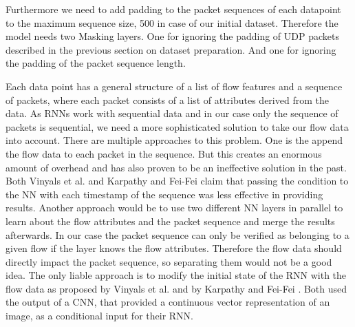 \documentclass[
	ngerman,
	ruledheaders=section,%
	class=report,%
	thesis={type=bachelor},%
	accentcolor=9c,%
	custommargins=true,%
	marginpar=false,%
	parskip=half-,%
	fontsize=11pt,%
]{tudapub}
\begin{document}
Furthermore we need to add padding to the packet sequences of each datapoint to the maximum sequence size, 500 in case of our initial dataset.
Therefore the model needs two Masking layers.
One for ignoring the padding of UDP packets described in the previous section on dataset preparation.
And one for ignoring the padding of the packet sequence length.

Each data point has a general structure of a list of flow features and a sequence of packets, where each packet consists of a list of attributes derived from the data.
As RNNs work with sequential data and in our case only the sequence of packets is sequential, we need a more sophisticated solution to take our flow data into account.
There are multiple approaches to this problem.
One is the append the flow data to each packet in the sequence.
But this creates an enormous amount of overhead and has also proven to be an ineffective solution in the past.
Both Vinyals et al. \cite{vinyalsShowTellNeural2015} and Karpathy and Fei-Fei \cite{karpathyDeepVisualSemanticAlignments2015} claim that passing the condition to the NN with each timestamp of the sequence was less effective in providing results.
Another approach would be to use two different NN layers in parallel to learn about the flow attributes and the packet sequence and merge the results afterwards.
In our case the  packet sequence can only be verified as belonging to a given flow if the layer knows the flow attributes.
Therefore the flow data should directly impact the packet sequence, so separating them would not be a good idea.
The only liable approach is to modify the initial state of the RNN with the flow data as proposed by Vinyals et al. \cite{vinyalsShowTellNeural2015} and by Karpathy and Fei-Fei \cite{karpathyDeepVisualSemanticAlignments2015}.
Both used the output of a CNN, that provided a continuous vector representation of an image, as a conditional input for their RNN.


\end{document}
